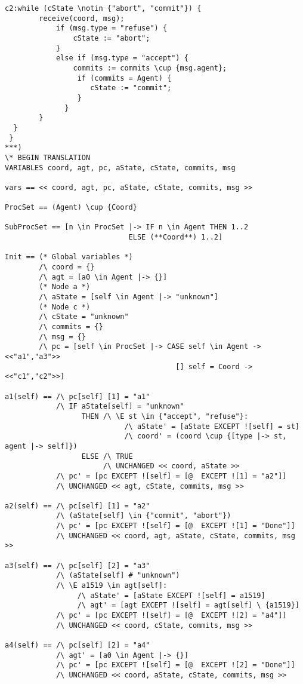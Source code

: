 \documentclass{thesul}
\begin{document}
\begin{appendices}
\begin{lstlisting}[caption = TLA+ translation for Sub-Processes, frame = tlrb, firstnumber = 1]
     c2:while (cState \notin {"abort", "commit"}) {
        receive(coord, msg);
            if (msg.type = "refuse") {
                cState := "abort";
            }
            else if (msg.type = "accept") {
                commits := commits \cup {msg.agent};
                 if (commits = Agent) {
                    cState := "commit";
                 }
              }
        }
  }
 }
***)
\* BEGIN TRANSLATION
VARIABLES coord, agt, pc, aState, cState, commits, msg

vars == << coord, agt, pc, aState, cState, commits, msg >>

ProcSet == (Agent) \cup {Coord}

SubProcSet == [n \in ProcSet |-> IF n \in Agent THEN 1..2
                             ELSE (**Coord**) 1..2]

Init == (* Global variables *)
        /\ coord = {}
        /\ agt = [a0 \in Agent |-> {}]
        (* Node a *)
        /\ aState = [self \in Agent |-> "unknown"]
        (* Node c *)
        /\ cState = "unknown"
        /\ commits = {}
        /\ msg = {}
        /\ pc = [self \in ProcSet |-> CASE self \in Agent -> <<"a1","a3">>
                                        [] self = Coord -> <<"c1","c2">>]

a1(self) == /\ pc[self] [1] = "a1"
            /\ IF aState[self] = "unknown"
                  THEN /\ \E st \in {"accept", "refuse"}:
                            /\ aState' = [aState EXCEPT ![self] = st]
                            /\ coord' = (coord \cup {[type |-> st, agent |-> self]})
                  ELSE /\ TRUE
                       /\ UNCHANGED << coord, aState >>
            /\ pc' = [pc EXCEPT ![self] = [@  EXCEPT ![1] = "a2"]]
            /\ UNCHANGED << agt, cState, commits, msg >>

a2(self) == /\ pc[self] [1] = "a2"
            /\ (aState[self] \in {"commit", "abort"})
            /\ pc' = [pc EXCEPT ![self] = [@  EXCEPT ![1] = "Done"]]
            /\ UNCHANGED << coord, agt, aState, cState, commits, msg >>

a3(self) == /\ pc[self] [2] = "a3"
            /\ (aState[self] # "unknown")
            /\ \E a1519 \in agt[self]:
                 /\ aState' = [aState EXCEPT ![self] = a1519]
                 /\ agt' = [agt EXCEPT ![self] = agt[self] \ {a1519}]
            /\ pc' = [pc EXCEPT ![self] = [@  EXCEPT ![2] = "a4"]]
            /\ UNCHANGED << coord, cState, commits, msg >>

a4(self) == /\ pc[self] [2] = "a4"
            /\ agt' = [a0 \in Agent |-> {}]
            /\ pc' = [pc EXCEPT ![self] = [@  EXCEPT ![2] = "Done"]]
            /\ UNCHANGED << coord, aState, cState, commits, msg >>


\end{lstlisting}
\end{appendices}
\end{document}
